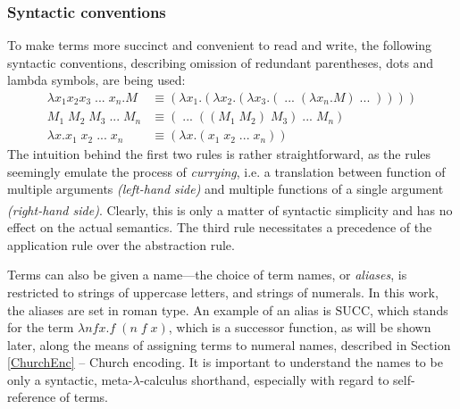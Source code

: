 \documentclass[table, a4paper, 10pt]{article}
\newcommand{\cit}[1]{\textsuperscript{\cite{#1}}}
\begin{document}
\subsubsection{Syntactic conventions} \label{sec:conventions}
To make terms more succinct and convenient to read and write, the 
following syntactic conventions, describing omission of redundant parentheses,
dots and lambda symbols, are being used:
\begin{align*}
	\lambda x_1 x_2 x_3\;...\;x_n.M &\equiv (\lambda x_1.(\lambda x_2.(\lambda x_3.(\;...\;(\lambda x_n.M)\;...\;))))\\
	M_1\;M_2\;M_3\;...\;M_n &\equiv (\;...\;((M_1\;M_2)\;M_3)\;...\;M_n)\\
	\lambda x.x_1\;x_2\;...\;x_n &\equiv (\lambda x.(x_1\;x_2\;...\;x_n))
\end{align*}
The intuition behind the first two rules is rather straightforward, as the rules
seemingly emulate the process of \textit{currying}, i.e.
a translation between function of multiple arguments \textit{(left-hand side)} and multiple
functions of a single argument \textit{(right-hand side)}.\cit{pierce} Clearly, this is only
a matter of syntactic simplicity and has no effect on the actual semantics.
The third rule necessitates a precedence of the application rule over the abstraction rule.

Terms can also be given a name---the choice of term names, or \textit{aliases}, is restricted to 
strings of uppercase letters, and strings of numerals. In this work, the aliases are set in roman type.
An example of an alias is $\mathrm{SUCC}$, which stands for the term $\lambda nfx.f\;(n\;f\;x)$,
which is a successor function, as will be shown later, along the means of
assigning terms to numeral names, described in Section \ref{ChurchEnc} -- Church encoding.
It is important to understand the names to be only a syntactic, meta-$\lambda$-calculus shorthand,
especially with regard to self-reference of terms.
\end{document}
